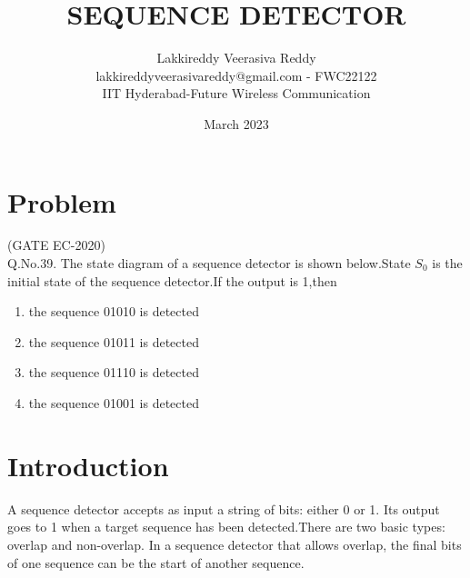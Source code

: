 \documentclass{article}
\title{SEQUENCE DETECTOR}
\date{March 2023}
\author{Lakkireddy Veerasiva Reddy\\lakkireddyveerasivareddy@gmail.com - FWC22122\\IIT Hyderabad-Future Wireless Communication}
\begin{document}
\maketitle
\tableofcontents
	\pagebreak
\section{Problem}
	(GATE EC-2020)\\
	Q.No.39. The state diagram of a sequence detector is shown below.State $S_0$ is the initial state of the sequence detector.If the output is 1,then
	\begin{figure}[h]                                                                                                               %
  \end{figure}	 
\begin{enumerate}
 \item the sequence 01010 is detected
 \item the sequence 01011 is detected
 \item the sequence 01110 is detected
 \item the sequence 01001 is detected	 
\end{enumerate}	
\section{Introduction}
  A sequence detector accepts as input a string of bits: either 0 or 1. Its output goes to 1 when a target sequence has been detected.There are two basic types:  overlap  and  non-overlap. In a sequence detector that allows overlap, the final bits of one sequence can be  the start of another sequence.
\end{document}
